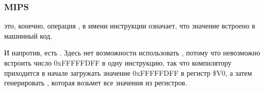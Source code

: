 ﻿\subsubsection{MIPS}



 это, конечно, операция ,  в имени инструкции означает, что значение встроено в машинный код.

И напротив, есть \AND. Здесь нет возможности использовать , потому что невозможно встроить число 
0xFFFFFDFF в одну инструкцию, так что компилятору приходится в начале загружать значение 0xFFFFFDFF в регистр \$V0,
а затем генерировать \AND, которая возьмет все значения из регистров.

